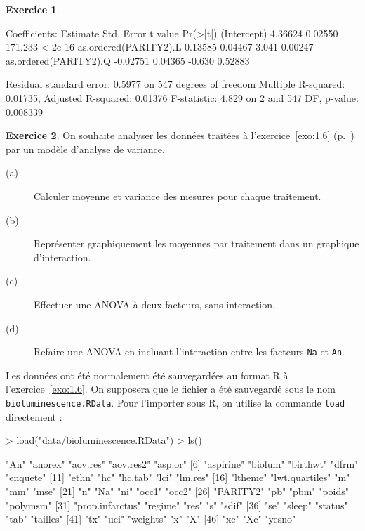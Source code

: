 \documentclass[11pt]{report}
\theoremstyle{definition}
\newtheorem{exo}{Exercice}[chapter]
\newcommand{\R}{\textsf{R}\xspace}
\begin{document}
\begin{exo}
\begin{sol}
\begin{Schunk}
\begin{Soutput}
Coefficients:
                      Estimate Std. Error t value Pr(>|t|)
(Intercept)            4.36624    0.02550 171.233  < 2e-16
as.ordered(PARITY2).L  0.13585    0.04467   3.041  0.00247
as.ordered(PARITY2).Q -0.02751    0.04365  -0.630  0.52883

Residual standard error: 0.5977 on 547 degrees of freedom
Multiple R-squared: 0.01735,	Adjusted R-squared: 0.01376 
F-statistic: 4.829 on 2 and 547 DF,  p-value: 0.008339 
\end{Soutput}
\end{Schunk}
\end{sol}
\end{exo}
%
%
\begin{exo}\label{exo:4.4}
On souhaite analyser les données traitées à l'exercice~\ref{exo:1.6}
(p.~\pageref{exo:1.6}) par un modèle d'analyse de variance.

\begin{description}
\item[(a)] Calculer moyenne et variance des mesures pour chaque traitement.
\item[(b)] Représenter graphiquement les moyennes par traitement dans un
  graphique d'interaction.
\item[(c)] Effectuer une ANOVA à deux facteurs, sans interaction.
\item[(d)] Refaire une ANOVA en incluant l'interaction entre les facteurs
  \texttt{Na} et \texttt{An}.
\end{description}
\begin{sol}
Les données ont été normalement été sauvegardées au format \R à
l'exercice~\ref{exo:1.6}. On supposera que le fichier a été sauvegardé sous
le nom \texttt{bioluminescence.RData}. Pour l'importer sous \R, on utilise
la commande \texttt{load} directement :
\begin{Schunk}
\begin{Sinput}
> load("data/bioluminescence.RData")
> ls()
\end{Sinput}
\begin{Soutput}
 [1] "An"             "anorex"         "aov.res"        "aov.res2"       "asp.or"        
 [6] "aspirine"       "biolum"         "birthwt"        "dfrm"           "enquete"       
[11] "ethn"           "hc"             "hc.tab"         "lci"            "lm.res"        
[16] "ltheme"         "lwt.quartiles"  "m"              "mm"             "mse"           
[21] "n"              "Na"             "ni"             "occ1"           "occ2"          
[26] "PARITY2"        "pb"             "pbm"            "poids"          "polymsm"       
[31] "prop.infarctus" "regime"         "res"            "s"              "sdif"          
[36] "se"             "sleep"          "status"         "tab"            "tailles"       
[41] "tx"             "uci"            "weights"        "x"              "X"             
[46] "xc"             "Xc"             "yesno"         
\end{Soutput}
\end{Schunk}


\end{sol}
\end{exo}
\end{document}
